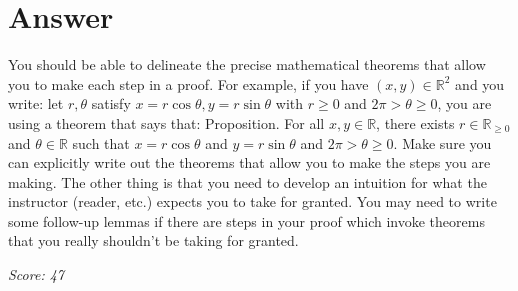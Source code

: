 \documentclass{article}
\begin{document}
\section*{Answer}
You should be able to delineate the precise mathematical theorems that allow you to make each step in a proof. For example, if you have $(x,y) \in \mathbb{R}^2$ and you write: let $r,\theta$ satisfy $x = r\cos \theta,y=r\sin \theta$ with $r\geq 0$ and $2\pi > \theta \geq 0$, you are using a theorem that says that: Proposition. For all $x,y \in \mathbb{R}$, there exists $r \in \mathbb{R}_{\geq 0}$ and $\theta \in \mathbb{R}$ such that $x=r\cos \theta$ and $y = r \sin \theta$ and $2\pi > \theta \geq 0$. Make sure you can explicitly write out the theorems that allow you to make the steps you are making. The other thing is that you need to develop an intuition for what the instructor (reader, etc.) expects you to take for granted. You may need to write some follow-up lemmas if there are steps in your proof which invoke theorems that you really shouldn't be taking for granted.

\vspace{1em}
\noindent\textit{Score: 47}
\end{document}

